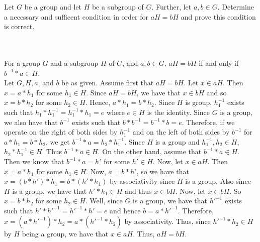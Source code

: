 Let $G$ be a group and let $H$ be a subgroup of $G$. Further, let $a,b\in G$. Determine a necessary and
sufficent condition in order for $aH=bH$ and prove this condition is correct.\\\\

\begin{solution}\renewcommand{\qedsymbol}{}\ \\
    For a group $G$ and a subgroup $H$ of $G$, and $a,b\in G$, $aH=bH$ if and only if $b^{-1}*a\in H$.\\

    Let $G, H, a$, and $b$ be as given. Assume first that $aH=bH$. Let $x\in aH$. Then $x=a*h_1$ for
    some $h_1\in H$. Since $aH=bH$, we have that $x\in bH$ and so $x=b*h_2$ for some $h_2\in H$. Hence,
    $a*h_1=b*h_2$. Since $H$ is group, $h_1^{-1}$ exists such that $h_1*h_1^{-1}=h_1^{-1}*h_1=e$ where
    $e\in H$ is the identity. Since $G$ is a group, we also have that $b^{-1}$ exists such that
    $b*b^{-1}=b^{-1}*b=e$. Therefore, if we operate on the right of both sides by $h_1^{-1}$ and on the
    left of both sides by $b^{-1}$ for $a*h_1=b*h_2$, we get $b^{-1}*a=h_2*h_1^{-1}$. Since $H$ is a
    group and $h_1^{-1}, h_2\in H$, $h_2*h_1^{-1}\in H$. Thus $b^{-1}*a\in H$. On the other hand, assume
    that $b^{-1}*a\in H$. Then we know that $b^{-1}*a=h'$ for some $h'\in H$. Now, let $x\in aH$. Then
    $x=a*h_1$ for some $h_1\in H$. Now, $a=b*h'$, so we have that $x=(b*h')*h_1=b*(h'*h_1)$ by
    associativity since $H$ is a group. Also since $H$ is a group, we have that $h'*h_1\in H$ and thus
    $x\in bH$. Now, let $x\in bH$. So $x=b*h_2$ for some $h_2\in H$. Well, since $G$ is a group, we have
    that $h'^{-1}$ exists such that $h'*h'^{-1}=h'^{-1}*h'=e$ and hence $b=a*h'^{-1}$. Therefore,
    $x=(a*h'^{-1})*h_2=a*(h'^{-1}*h_2)$ by associativity. Thus, since $h'^{-1}*h_2\in H$ by $H$ being a
    group, we have that $x\in aH$. Thus, $aH=bH$.

\end{solution}